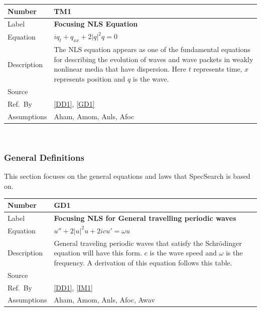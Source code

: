 \documentclass[12pt]{article}
\newcommand{\colAwidth}{0.13\textwidth}
\newcommand{\colBwidth}{0.82\textwidth}
\begin{document}
\noindent
\begin{minipage}{\textwidth} \label{T1}
	\renewcommand*{\arraystretch}{1.5}
	\begin{tabular}{| p{\colAwidth} | p{\colBwidth}|}
		\hline
		\rowcolor[gray]{0.9}
		Number& TM1\\
		\hline
		Label&\bf Focusing NLS Equation\\
		\hline
		Equation&  $iq_{t} + q_{xx} + 2|q|^{2}q=0$\\
		\hline
		Description & 
		The NLS equation appears as one of the fundamental equations for 
		describing 
		the evolution of waves and wave packets in 
		weakly nonlinear media that have dispersion. Here $t$ 
		represents time, $x$ represents position and $q$ is the wave.\\
		\hline
		Source &
		\cite{SegaletAl}\\
		\hline
		Ref.\ By & \ref{DD1}, \ref{GD1}\\
		\hline 
		Assumptions & Aham, Amom, Anls, Afoc \\
		\hline 
	\end{tabular}
\end{minipage}\\ 

\subsubsection{General Definitions}\label{sec_gendef}

This section focuses on the general equations and laws that SpecSearch is based
on. 
~\newline

\noindent
\begin{minipage}{\textwidth} \label{GD1} 
	\renewcommand*{\arraystretch}{1.5}
	\begin{tabular}{| p{\colAwidth} | p{\colBwidth}|}
		\hline
		\rowcolor[gray]{0.9}
		Number& GD1\\
		\hline
		Label&\bf Focusing NLS for General travelling periodic waves\\
		\hline
		Equation&  $ u'' + 2|u|^{2}u+2icu'=\omega u$\\
		\hline
		Description & 
		General traveling periodic waves that satisfy the Schr\"{o}dinger 
		equation 
		will have this form. $c$ is the wave speed and $\omega$ is the 
		frequency. A derivation of this equation follows this table.\\
		\hline
		Source &
		\cite{SegaletAl}\\
		\hline
		Ref.\ By & \ref{DD1}, \ref{IM1}\\
		\hline 
		Assumptions & Aham, Amom, Anls, Afoc, Awav \\
		\hline 
	\end{tabular}
\end{minipage}\\ 
\end{document}

